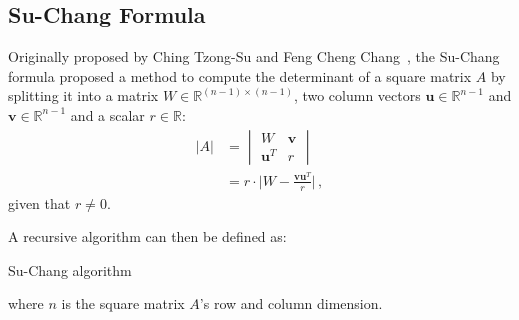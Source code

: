 \subsection{Su-Chang Formula} \label{add:suchang_formula}
Originally proposed by Ching Tzong-Su and Feng Cheng Chang~\cite{su1996quick}, the Su-Chang formula proposed a method to compute the determinant of a square matrix $A$ by splitting it into a matrix $W\in\mathbb{R}^{(n-1)\times(n-1)}$, two column vectors $\mathbf{u}\in\mathbb{R}^{n-1}$ and $\mathbf{v}\in\mathbb{R}^{n-1}$ and a scalar $r\in\mathbb{R}$:
    \begin{align*}
        |A| &=
        \begin{vmatrix}
            W            & \mathbf{v} \\
            \mathbf{u}^T & r
        \end{vmatrix}\\
        &= r\cdot\Big|W - \frac{\mathbf{v}\mathbf{u}^T}{r}\Big|\,,
    \end{align*}
given that $r\neq0$.

A recursive algorithm can then be defined as:

    \begin{algorithm}[H]
        \caption{Su-Chang algorithm}
        \label{alg:suchang}
        \SetAlgoLined
        \DontPrintSemicolon
    \end{algorithm}

where $n$ is the square matrix $A$'s row and column dimension.

